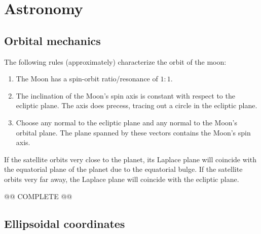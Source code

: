 \section{Astronomy}
\subsection{Orbital mechanics}

    \begin{theorem}
        The following rules (approximately) characterize the orbit of the moon:
        \begin{enumerate}
            \item The Moon has a spin-orbit ratio/resonance of $1:1$.
            \item The inclination of the Moon's spin axis is constant with respect to the ecliptic plane. The axis does precess, tracing out a circle in the ecliptic plane.
            \item Choose any normal to the ecliptic plane and any normal to the Moon's orbital plane. The plane spanned by these vectors contains the Moon's spin axis.
        \end{enumerate}
    \end{theorem}

    \begin{property}
        If the satellite orbits very close to the planet, its Laplace plane will coincide with the equatorial plane of the planet due to the equatorial bulge. If the satellite orbits very far away, the Laplace plane will coincide with the ecliptic plane.
    \end{property}

    @@ COMPLETE @@

\subsection{Ellipsoidal coordinates}

